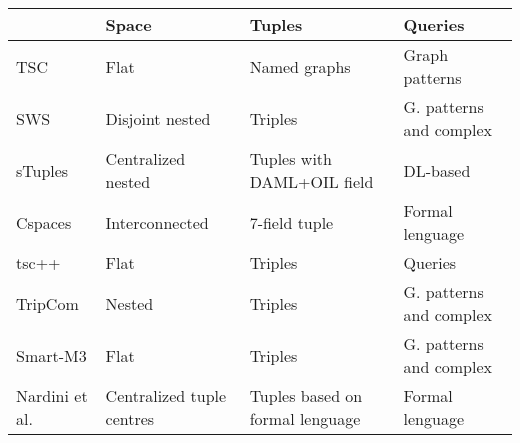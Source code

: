 

\begin{table}[htbp]
\caption{}

\begin{tabular}{ l p{3cm} p{3cm} p{3cm} }
\hline 
  & Space  & Tuples  & Queries \tabularnewline
\hline 
 TSC & Flat  & Named graphs  & Graph patterns \tabularnewline
 SWS & Disjoint nested  & Triples  & G. patterns and complex \tabularnewline
 sTuples & Centralized nested  & Tuples with DAML+OIL field  & DL-based \tabularnewline
 Cspaces & Interconnected  & 7-field tuple  & Formal lenguage \tabularnewline
 tsc++ & Flat  & Triples  & Queries \tabularnewline
 TripCom & Nested  & Triples  & G. patterns and complex \tabularnewline
 Smart-M3 & Flat  & Triples  & G. patterns and complex \tabularnewline
 Nardini et al. & Centralized tuple centres & Tuples based on formal lenguage  & Formal lenguage \tabularnewline
\hline 
\end{tabular}\label{} 
\end{table}